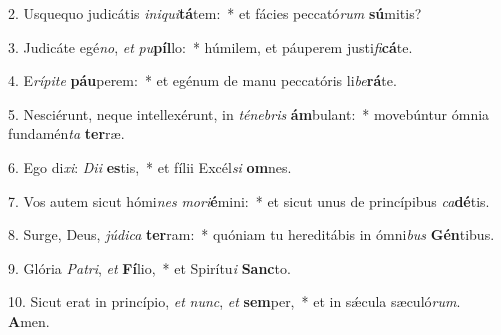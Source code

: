 2. Usquequo judicátis \textit{in}\textit{i}\textit{qui}\textbf{tá}tem:~*  et fácies peccató\textit{rum} \textbf{sú}mitis?\

3. Judicáte egé\textit{no}, \textit{et} \textit{pu}\textbf{píl}lo:~*  húmilem, et páuperem justi\textit{fi}\textbf{cá}te.\

4. E\textit{rí}\textit{pi}\textit{te} \textbf{páu}perem:~*  et egénum de manu peccatóris li\textit{be}\textbf{rá}te.\

5. Nesciérunt, neque intellexérunt, in \textit{té}\textit{ne}\textit{bris} \textbf{ám}bulant:~*  movebúntur ómnia fundamén\textit{ta} \textbf{ter}ræ.\

6. Ego di\textit{xi}: \textit{Di}\textit{i} \textbf{es}tis,~*  et fílii Excél\textit{si} \textbf{om}nes.\

7. Vos autem sicut hómi\textit{nes} \textit{mo}\textit{ri}\textbf{é}mini:~*  et sicut unus de princípibus \textit{ca}\textbf{dé}tis.\

8. Surge, Deus, \textit{jú}\textit{di}\textit{ca} \textbf{ter}ram:~*  quóniam tu hereditábis in ómni\textit{bus} \textbf{Gén}tibus.\

9. Glória \textit{Pa}\textit{tri}, \textit{et} \textbf{Fí}lio,~*  et Spirítu\textit{i} \textbf{Sanc}to.\

10. Sicut erat in princípio, \textit{et} \textit{nunc}, \textit{et} \textbf{sem}per,~*  et in sǽcula sæculó\textit{rum}. \textbf{A}men.\

